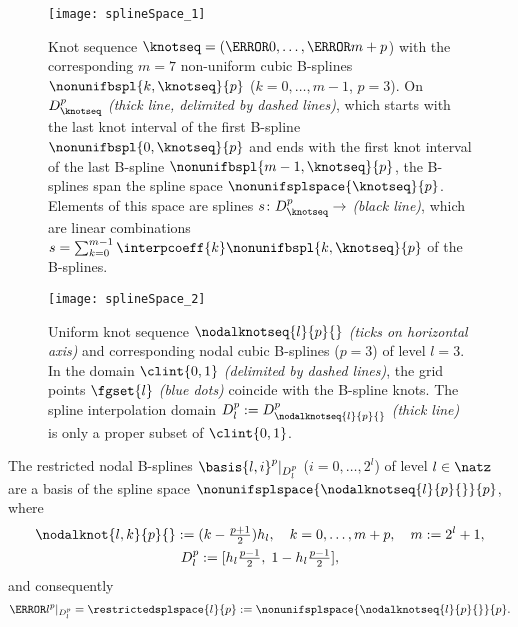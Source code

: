 \begin{figure}
  \texttt{[image: splineSpace\_1]}%
  \caption{%
    Knot sequence $\knotseq = (\knot{0}, \dotsc, \knot{m+p}$)
    with the corresponding $m = 7$ non-uniform cubic B-splines
    $\nonunifbspl{k,\knotseq}{p}$ ($k = 0, \dotsc, m - 1$, $p = 3$).
    On $D_\knotseq^p$ \emph{(thick line, delimited by dashed lines)},
    which starts with the last knot interval of the first B-spline
    $\nonunifbspl{0,\knotseq}{p}$
    and ends with the first knot interval of the last B-spline
    $\nonunifbspl{m-1,\knotseq}{p}$,
    the B-splines span the spline space $\nonunifsplspace{\knotseq}{p}$.
    Elements of this space are splines $s\colon D_\knotseq^p \to \real$
    \emph{(black line)},
    which are linear combinations
    $s = \sum_{k=0}^{m-1} \interpcoeff{k} \nonunifbspl{k,\knotseq}{p}$
    of the B-splines.%
  }%
  \label{fig:splineSpaceGeneral}%
\end{figure}

\begin{figure}
  \texttt{[image: splineSpace\_2]}%
  \caption{%
    Uniform knot sequence $\nodalknotseq{l}{p}{}$ \emph{(ticks on horizontal axis)}
    and corresponding nodal cubic B-splines ($p = 3$) of level $l = 3$.
    In the domain $\clint{0, 1}$ \emph{(delimited by dashed lines)},
    the grid points $\fgset{l}$ \emph{\textcolor{mittelblau}{(blue dots)}}
    coincide with the B-spline knots.
    The spline interpolation domain $D_l^p := D_{\nodalknotseq{l}{p}{}}^p$
    \emph{(thick line)}
    is only a proper subset of $\clint{0, 1}$.%
  }%
  \label{fig:splineSpaceUniform}%
\end{figure}

\begin{corollary}
  \label{cor:nodalBSplineSpace}
  The restricted nodal B-splines $\basis{l,i}^p|_{D_l^p}$
  ($i = 0, \dotsc, 2^l$)
  of level $l \in \natz$ are
  a basis of the spline space $\nonunifsplspace{\nodalknotseq{l}{p}{}}{p}$,
  where
  \begin{gather}
    \label{eq:nodalBSplineSpaceKnots}
    \nodalknot{l,k}{p}{}
    := (k - \tfrac{p+1}{2}) \ms{l},\quad
    k = 0, \dotsc, m + p,\quad
    m := 2^l + 1,\\
    D_l^p := [\ms{l} \tfrac{p-1}{2},\;
    1 - \ms{l} \tfrac{p-1}{2}],
  \end{gather}
  and consequently
  \begin{equation}
    \ns{l}^p|_{D_l^p}
    = \restrictedsplspace{l}{p}
    := \nonunifsplspace{\nodalknotseq{l}{p}{}}{p}.
  \end{equation}
\end{corollary}

